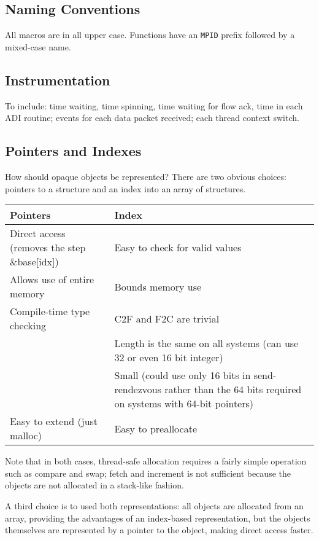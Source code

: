 \documentclass{article}
\let\code=\texttt
\begin{document}
\subsection{Naming Conventions}
All macros are in all upper case.  Functions have an \code{MPID} prefix
followed by a mixed-case name.


\subsection{Instrumentation}
To include: time waiting, time spinning, time waiting for flow ack, time in
each ADI routine; events for each data packet received; each thread context
switch. 

\subsection{Pointers and Indexes}
How should opaque objects be represented?  There are two obvious choices:
pointers to a structure and an index into an array of structures.  

\begin{center}
\begin{tabular}{p{2.5in}p{2.5in}}
Pointers&Index\\\hline
Direct access (removes the step \&base[idx])&Easy to check for valid values\\
Allows use of entire memory&Bounds memory use\\
Compile-time type checking&C2F and F2C are trivial\\
&Length is the same on all systems (can use 32 or even 16 bit integer)\\
&Small (could use only 16 bits in send-rendezvous rather than the 64 bits
required on systems with 64-bit pointers)\\
Easy to extend (just malloc)&Easy to preallocate\\
\end{tabular}
\end{center}
Note that in both cases, thread-safe allocation requires a fairly simple
operation such as compare and swap; fetch and increment is not sufficient
because the objects are not allocated in a stack-like fashion.

A third choice is to used both representations:  all objects are allocated
from an array, providing the advantages of an index-based representation, but
the objects themselves are represented by a pointer to the object, making
direct access faster.



\end{document}
